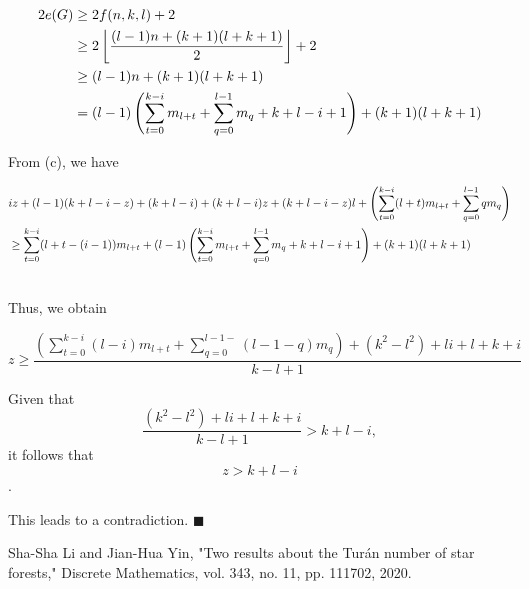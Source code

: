 \documentclass[12pt]{elsarticle}
\begin{document}
    
    \begin{small}
\begin{align}
2e(G) &\ge 2f(n, k, l) + 2 \notag \\
&\ge 2 \left\lfloor \frac{(l-1)n + (k+1)(l+k+1)}{2} \right\rfloor+2 \notag \\
&\ge (l-1)n + (k+1)(l+k+1) \notag \\
&= (l-1)\left(\sum_{t=0}^{k-i} m_{l+t} + \sum_{q=0}^{l-1} m_{q} + k + l - i + 1\right) + (k+1)(l+k+1) \notag
\end{align}
\end{small}

From (c), we have
\begin{footnotesize}
    \begin{align}
    & iz + (l-1)(k + l - i - z) + (k + l - i) + (k + l - i)z + (k + l - i - z)l + \left(\sum_{t=0}^{k-i}(l + t)m_{l+t} + \sum_{q=0}^{l-1}qm_{q}\right) \notag \\
    & \ge \sum_{t=0}^{k-i} (l + t - (i - 1))m_{l+t} +(l-1)\left(\sum_{t=0}^{k-i} m_{l+t} + \sum_{q=0}^{l-1} m_{q} + k + l - i + 1\right) + (k+1)(l+k+1) \notag
    \end{align}
    \end{footnotesize} \\
    

Thus, we obtain

$$
z \ge \frac{\left(\sum_{t=0}^{k-i} (l - i)m_{l+t} + \sum_{q=0}^{l-1-}(l-1-q) m_{q}\right) + (k^2-l^2)+li+l+k+i}{k-l+1} 
$$

Given that $$\frac{(k^2-l^2)+li+l+k+i}{k-l+1} > k+l-i,$$ it follows that $$z > k + l - i$$.



This leads to a contradiction. $\blacksquare$



\begin{thebibliography}{00}
    Sha-Sha Li and Jian-Hua Yin, "Two results about the Turán number of star forests," Discrete Mathematics, vol. 343, no. 11, pp. 111702, 2020.
    

\end{thebibliography}
\end{document}
